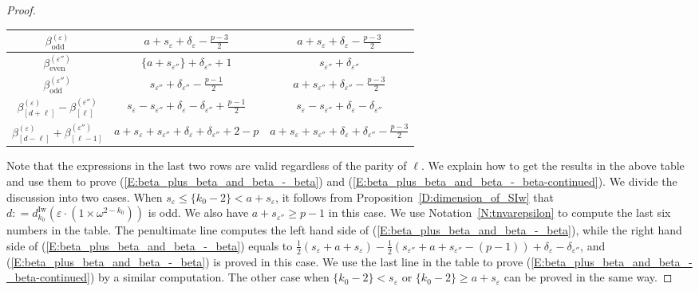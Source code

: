 \begin{proof}
\begin{center}
\begin{tabular}{|c|c|c|}
    \hline
    $\beta^{(\varepsilon)}_{\mathrm{odd}}$ & $a+s_\varepsilon + \delta_\varepsilon - \frac{p-3}2$ & $a+s_\varepsilon + \delta_\varepsilon - \frac{p-3}2$  \\
    \hline
    $\beta^{(\varepsilon'')}_{\mathrm{even}}$ & $\{a+s_{\varepsilon''}\}  + \delta_{\varepsilon''}+1$& $s_{\varepsilon''} + \delta_{\varepsilon''}$ \\
    \hline
    $\beta^{(\varepsilon'')}_{\mathrm{odd}}$ & $s_{\varepsilon''} + \delta_{\varepsilon''} -\frac{p-1}2$&$a+s_{\varepsilon''} + \delta_{\varepsilon''} - \frac{p-3}2$ \\
    \hline
    $\beta_{[d+\ell]}^{(\varepsilon)} - \beta_{[\ell]}^{(\varepsilon'')}$ & $s_\varepsilon -s_{\varepsilon''} +  \delta_\varepsilon - \delta_{\varepsilon''} +\frac{p-1}2$ & $s_\varepsilon - s_{\varepsilon''} + \delta_{\varepsilon } - \delta_{\varepsilon''}$ \\
    \hline
    $\beta_{[d-\ell]}^{(\varepsilon)} + \beta_{[\ell-1]}^{(\varepsilon'')}$  & $a+  s_\varepsilon + s_{\varepsilon''} + \delta_\varepsilon + \delta_{\varepsilon ''} +2-p$ & $a+  s_\varepsilon + s_{\varepsilon''} + \delta_\varepsilon + \delta_{\varepsilon ''} -\frac{p-3}2$ \\
    \hline
    \end{tabular}
    \end{center}
    Note that the expressions in the last two rows are valid regardless of the parity of $\ell$.
    We explain how to get the results in the above table and use them to prove (\ref{E:beta_plus_beta_and_beta_-_beta}) and (\ref{E:beta_plus_beta_and_beta_-_beta-continued}).
    We divide the discussion into two cases.
    When $s_\varepsilon\leq  \{k_0-2\} < a+s_\varepsilon$, it follows from Proposition~\ref{D:dimension_of_SIw} that $d: = d_{k_0}^{\mathrm{Iw}}(\varepsilon\cdot (1\times \omega^{2-k_0}))$ is odd.
    We also have $a+s_{\varepsilon''}\geq p-1$ in this case.
    We use Notation~\ref{N:tnvarepsilon} to compute the last six numbers in the table.
    The penultimate line computes the left hand side of (\ref{E:beta_plus_beta_and_beta_-_beta}), while the right hand side of (\ref{E:beta_plus_beta_and_beta_-_beta}) equals to $\frac 12(s_\varepsilon+a+s_\varepsilon)-\frac 12(s_{\varepsilon''}+a+s_{\varepsilon''}-(p-1))+\delta_\varepsilon-\delta_{\varepsilon''}$, and (\ref{E:beta_plus_beta_and_beta_-_beta}) is proved in this case.
    We use the last line in the table to prove (\ref{E:beta_plus_beta_and_beta_-_beta-continued}) by a similar computation.
    The other case when $\{k_0-2\}< s_\varepsilon $ or $\{k_0-2\} \geq a+s_\varepsilon$ can be proved in the same way.

\end{proof}

